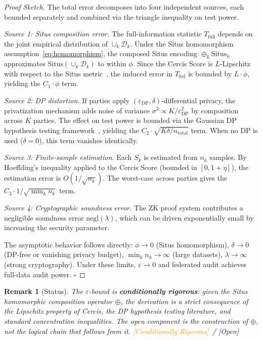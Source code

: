 \documentclass[12pt,a4paper]{article}
\newtheorem{remark}[theorem]{Remark}
\newcommand{\conditionallyrigorous}{\textcolor{orange}{\small\textsf{[Conditionally Rigorous]}}}
\newcommand{\openquest}{\textcolor{red!70!black}{\small\textsf{[Open]}}}
\newcommand{\cD}{\mathcal{D}}
\newcommand{\Situs}{\mathrm{Situs}}
\newcommand{\ZK}{\mathrm{ZK}}
\begin{document}
\begin{proof}[Proof Sketch]
The total error decomposes into four independent sources, each bounded
separately and combined via the triangle inequality on test power.

\textit{Source 1: Situs composition error.}
The full-information statistic $T_{\mathrm{full}}$ depends on the joint
empirical distribution of $\cup_k \cD_k$.  Under the Situs homomorphism
assumption~\eqref{eq:homomorphism}, the composed Situs encoding
$\oplus_k \Situs_k$ approximates $\Situs(\cup_k \cD_k)$ to within $\phi$.
Since the Cercis Score is $L$-Lipschitz with respect to the Situs
metric~\citep{scx2024cercis}, the induced error in $T_{\mathrm{fed}}$
is bounded by $L \cdot \phi$, yielding the $C_1 \cdot \phi$ term.

\textit{Source 2: DP distortion.}
If parties apply $(\varepsilon_{\mathrm{DP}}, \delta)$-differential privacy,
the privatization mechanism adds noise of variance
$\sigma^2 \propto K/\varepsilon_{\mathrm{DP}}^2$ by composition across $K$
parties.  The effect on test power is bounded via the Gaussian DP
hypothesis testing framework~\citep{dong2022gaussian}, yielding the
$C_2 \cdot \sqrt{K \delta / n_{\mathrm{total}}}$ term.  When no DP is
used ($\delta = 0$), this term vanishes identically.

\textit{Source 3: Finite-sample estimation.}
Each $S_k$ is estimated from $n_k$ samples.  By Hoeffding's inequality
applied to the Cercis Score (bounded in $[0, 1+\eta]$), the estimation
error is $O(1/\sqrt{n_k})$.  The worst-case across parties gives the
$C_3 \cdot 1/\sqrt{\min_k n_k}$ term.

\textit{Source 4: Cryptographic soundness error.}
The $\ZK$ proof system contributes a negligible soundness error
$\mathrm{negl}(\lambda)$, which can be driven exponentially small by
increasing the security parameter.

The asymptotic behavior follows directly: $\phi \to 0$ (Situs homomorphism),
$\delta \to 0$ (DP-free or vanishing privacy budget), $\min_k n_k \to \infty$
(large datasets), $\lambda \to \infty$ (strong cryptography).  Under these
limits, $\varepsilon \to 0$ and federated audit achieves full-data audit
power.  $\square$
\end{proof}

\begin{remark}[Status]
The $\varepsilon$-bound is \textbf{conditionally rigorous}: given the Situs
homomorphic composition operator $\oplus$, the derivation is a strict
consequence of the Lipschitz property of Cercis, the DP hypothesis testing
literature, and standard concentration inequalities.  The open component is
the \emph{construction} of $\oplus$, not the logical chain that follows
from it.  \conditionallyrigorous~/ \openquest
\end{remark}
\end{document}
